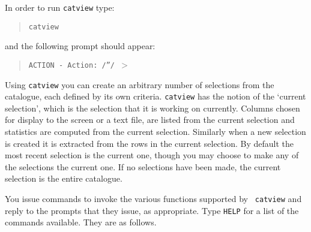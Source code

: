 \documentclass[twoside,11pt]{article}
\renewcommand{\_}{\texttt{\symbol{95}}}
\begin{document}
In order to run {\tt catview} type:

\begin{verse}
{\tt catview}
\end{verse}

and the following prompt should appear:

\begin{verse}
{\tt ACTION - Action: /''/ $>$}
\end{verse}

Using {\tt catview} you can create an arbitrary number of selections from
the catalogue, each defined by its own criteria. {\tt catview} has the 
notion of the `current selection', which is the selection that it is
working on currently.  Columns chosen for display to the screen or a
text file, are listed from the current selection and statistics are
computed from the current selection.  Similarly when a new selection is
created it is extracted from the rows in the current selection.  By default
the most recent selection is the current one, though you may choose to make
any of the selections the current one.  If no selections have been made, the
current selection is the entire catalogue.

You issue commands to invoke the various functions supported by {\tt
catview} and reply to the prompts that they issue, as appropriate.
Type {\tt HELP} for a list of the commands available.  They are as
follows.
\end{document}
